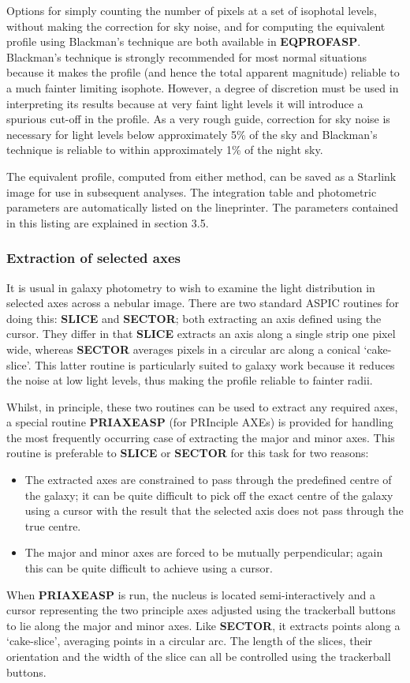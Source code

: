 Options for simply counting the number of pixels at a set of isophotal levels,
without making the correction for sky noise, and for computing the equivalent
profile using Blackman's technique are both available in {\bf EQPROFASP}.
Blackman's technique is strongly recommended for most normal situations because
it makes the profile (and hence the total apparent magnitude) reliable to a much
fainter limiting isophote.
However, a degree of discretion must be used in interpreting its results because
at very faint light levels it will introduce a spurious cut-off in the profile.
As a very rough guide, correction for sky noise is necessary for light levels
below approximately 5\% of the sky and Blackman's technique is reliable to within
approximately 1\% of the night sky.

The equivalent profile, computed from either method, can be saved as a Starlink
image for use in subsequent analyses.
The integration table and photometric parameters are automatically listed on the
lineprinter.
The parameters contained in this listing are explained in section 3.5.
\subsubsection {Extraction of selected axes}
It is usual in galaxy photometry to wish to examine the light distribution in
selected axes across a nebular image.
There are two standard ASPIC routines for doing this: {\bf SLICE} and
{\bf SECTOR}; both extracting an axis defined using the cursor.
They differ in that {\bf SLICE} extracts an axis along a single strip one pixel
wide, whereas {\bf SECTOR} averages pixels in a circular arc along a conical
`cake-slice'.
This latter routine is particularly suited to galaxy work because it reduces the
noise at low light levels, thus making the profile reliable to fainter radii.

Whilst, in principle, these two routines can be used to extract any required
axes, a special routine {\bf PRIAXEASP} (for PRInciple AXEs) is provided for
handling the most frequently occurring case of extracting the major and minor
axes.
This routine is preferable to {\bf SLICE} or {\bf SECTOR} for this task for two
reasons:
\begin{itemize}
\item The extracted axes are constrained to pass through the predefined centre
of the galaxy; it can be quite difficult to pick off the exact centre of the
galaxy using a cursor with the result that the selected axis does not pass
through the true centre.
\item The major and minor axes are forced to be mutually perpendicular; again
this can be quite difficult to achieve using a cursor.
\end{itemize}
When {\bf PRIAXEASP} is run, the nucleus is located semi-interactively and a cursor
representing the two principle axes adjusted using the trackerball buttons to
lie along the major and minor axes.
Like {\bf SECTOR}, it extracts points along a `cake-slice', averaging points in a
circular arc.
The length of the slices, their orientation and the width of the slice can all
be controlled using the trackerball buttons.

